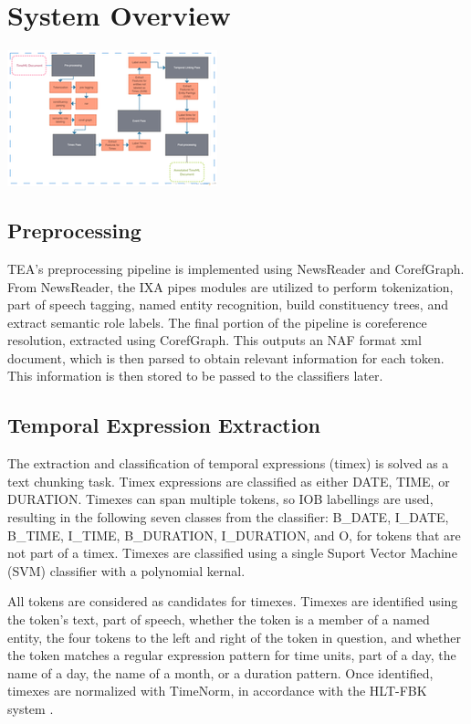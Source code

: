 \documentclass[11pt,letterpaper]{article}
\begin{document}
\section{System Overview}

\noindent\includegraphics{rsz_tea}

\subsection{Preprocessing}

TEA's preprocessing pipeline is implemented using NewsReader and CorefGraph. From NewsReader, the IXA pipes modules are utilized to perform tokenization, part of speech tagging, named entity recognition, build constituency trees, and extract semantic role labels. The final portion of the pipeline is coreference resolution, extracted using CorefGraph. This outputs an NAF format xml document, which is then parsed to obtain relevant information for each token. This information is then stored to be passed to the classifiers later.

\subsection{Temporal Expression Extraction}

The extraction and classification of temporal expressions (timex) is solved as a text chunking task. Timex expressions are classified as either DATE, TIME, or DURATION. Timexes can span multiple tokens, so IOB labellings are used, resulting in the following seven classes from the classifier: B\_DATE, I\_DATE, B\_TIME, I\_TIME, B\_DURATION, I\_DURATION, and O, for tokens that are not part of a timex. Timexes are classified using a single Suport Vector Machine (SVM) classifier with a polynomial kernal.

All tokens are considered as candidates for timexes. Timexes are identified using the token's text, part of speech, whether the token is a member of a named entity, the four tokens to the left and right of the token in question, and whether the token matches a regular expression pattern for time units, part of a day, the name of a day, the name of a month, or a duration pattern. Once identified, timexes are normalized with TimeNorm, in accordance with the HLT-FBK system \cite{Mirza:15}.
\end{document}
